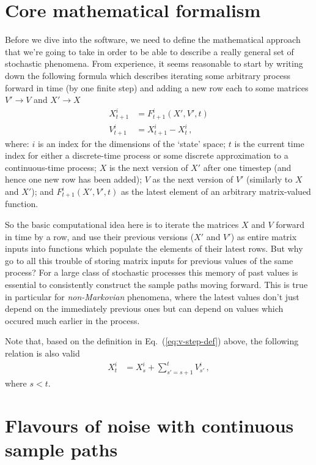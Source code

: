 \documentclass{book}
\begin{document}
\section{\sffamily Core mathematical formalism}

Before we dive into the software, we need to define the mathematical approach that we're going to take in order to be able to describe a really general set of stochastic phenomena. From experience, it seems reasonable to start by writing down the following formula which describes iterating some arbitrary process forward in time (by one finite step) and adding a new row each to some matrices $V' \rightarrow V$ and $X' \rightarrow X$
\begin{align}
X^{i}_{t+1} &= F^{i}_{t+1}(X', V', t) \label{eq:x-step-def}\\
V^{i}_{t+1} &= X^{i}_{t+1} - X^{i}_{t} \label{eq:v-step-def}\,,
\end{align}
where: $i$ is an index for the dimensions of the `state' space; $t$ is the current time index for either a discrete-time process or some discrete approximation to a continuous-time process; $X$ is the next version of $X'$ after one timestep (and hence one new row has been added); $V$ as the next version of $V'$ (similarly to $X$ and $X'$); and $F^i_{t+1}(X', V', t)$ as the latest element of an arbitrary matrix-valued function.

So the basic computational idea here is to iterate the matrices $X$ and $V$ forward in time by a row, and use their previous versions ($X'$ and $V'$) as entire matrix inputs into functions which populate the elements of their latest rows. But why go to all this trouble of storing matrix inputs for previous values of the same process? For a large class of stochastic processes this memory of past values is essential to consistently construct the sample paths moving forward. This is true in particular for \emph{non-Markovian} phenomena, where the latest values don't just depend on the immediately previous ones but can depend on values which occured much earlier in the process.

Note that, based on the definition in Eq.~(\ref{eq:v-step-def}) above, the following relation is also valid
\begin{align}
X^{i}_{t} &= X_{s}^{i} + \sum_{s'=s+1}^{t}V_{s'}^{i} \label{eq:x-implicit-solution} \,,
\end{align}
where $s<t$.



\section{\sffamily Flavours of noise with continuous sample paths}
\end{document}
